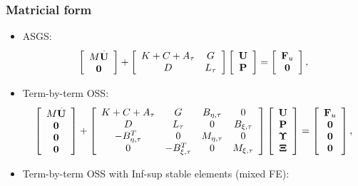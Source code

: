 \begin{frame}
\frametitle{Matricial form}
\begin{itemize}
\item<1-> ASGS:
\begin{equation*}
\left[\begin{array}{c}
M\overset{.}{{\bf U}}\\
\mathbf{0}
\end{array}\right]+\left[\begin{array}{cc}
K+C+A_\tau&G\\
D&L_\tau
\end{array}\right]\left[\begin{array}{c}
{\bf U}\\
{\bf P}
\end{array}\right]=\left[\begin{array}{c}
{\bf F}_u\\
\mathbf{0}
\end{array}\right],
\end{equation*}
\item<2-> Term-by-term OSS:
\begin{equation*}
\left[\begin{array}{c}
M\overset{.}{{\bf U}}\\
\mathbf{0}\\
\mathbf{0}\\
\mathbf{0}
\end{array}\right]+\left[\begin{array}{cccc}
K+C+A_\tau&G&B_{\eta,\tau}&0\\
D&L_\tau&0&B_{\xi,\tau}\\
-B_{\eta,\tau}^T&0&M_{\eta,\tau}&0\\
0&-B_{\xi,\tau}^T&0&M_{\xi,\tau}
\end{array}\right]\left[\begin{array}{c}
{\bf U}\\
{\bf P}\\
\boldsymbol{\Upsilon}\\
{\boldsymbol{\Xi}}
\end{array}\right]=\left[\begin{array}{c}
{\bf F}_u\\
\mathbf{0}\\
\mathbf{0}\\
\mathbf{0}
\end{array}\right],
\end{equation*}
\item<3-> Term-by-term OSS with Inf-sup stable elements (mixed FE):

\end{itemize}
\end{frame}
